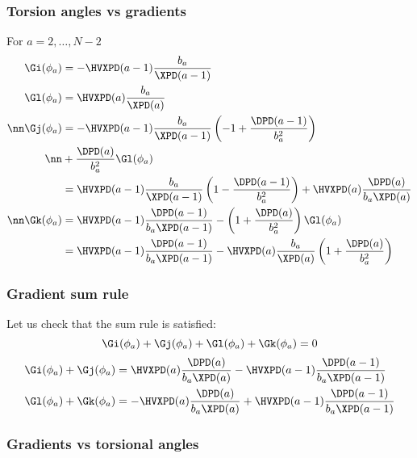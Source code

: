 \clearpage
\subsubsection{Torsion angles vs gradients }

For $a=2,\ldots,N-2$
\begin{align}
  \label{my-Gi}
  \Gi(\phi_a)&=-\HVXPD(a-1)\frac{b_{a}}{\XPD(a-1)}  \\
  \label{my-Gl}
  \Gl(\phi_a)&=\HVXPD(a)\frac{b_{a}}{\XPD(a)} \\
  \nn\Gj(\phi_a)&=-\HVXPD(a-1)\frac{b_{a}}{\XPD(a-1)}
  \left(-1+\frac{\DPD(a-1)}{b_a^2}\right)\\
  \nn&+\frac{\DPD(a)}{b_a^2}\Gl(\phi_a)\\
  \label{my-Gj}
  &=\HVXPD(a-1)\frac{b_{a}}{\XPD(a-1)}\left(1-\frac{\DPD(a-1)}{b_a^2}\right)
  +\HVXPD(a)\frac{\DPD(a)}{b_a\XPD(a)}\\
  \nn\Gk(\phi_a)&=\HVXPD(a-1)\frac{\DPD(a-1)}{b_a\XPD(a-1)}-\left(1+\frac{\DPD(a)}{b_a^2}\right)\Gl(\phi_a)\\
  \label{my-Gk}
  &=\HVXPD(a-1)\frac{\DPD(a-1)}{b_a\XPD(a-1)}-
  \HVXPD(a)\frac{b_{a}}{\XPD(a)}\left(1+\frac{\DPD(a)}{b_a^2}\right)
\end{align}

\subsubsection{Gradient sum rule}
Let us check that the sum rule is satisfied:
\begin{equation}
  \Gi(\phi_a)+\Gj(\phi_a)+\Gl(\phi_a)+\Gk(\phi_a)=0
\end{equation}
\begin{align}
\Gi(\phi_a)+\Gj(\phi_a)&=\HVXPD(a)\frac{\DPD(a)}{b_a\XPD(a)}-
\HVXPD(a-1)\frac{\DPD(a-1)}{b_a\XPD(a-1)}\\
\Gl(\phi_a)+\Gk(\phi_a)&=-\HVXPD(a)\frac{\DPD(a)}{b_a\XPD(a)}+
\HVXPD(a-1)\frac{\DPD(a-1)}{b_a\XPD(a-1)}
\end{align}

\clearpage
\subsubsection{Gradients vs torsional angles}

